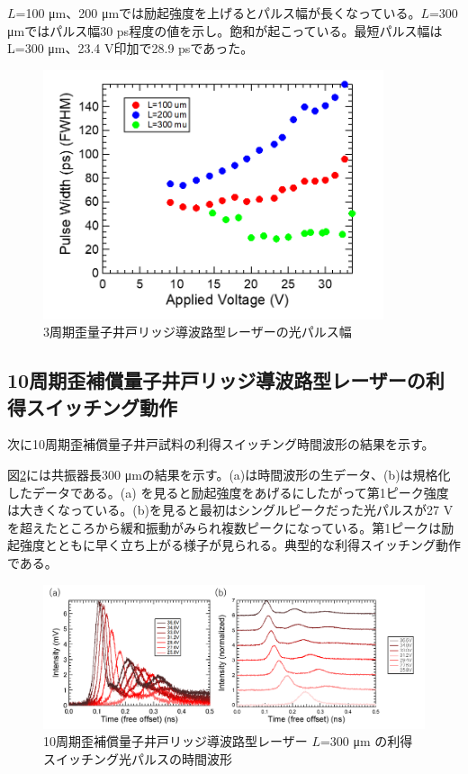 {{$L$=100 \si{\micro\metre}、200 \si{\micro\metre}では励起強度を上げるとパルス幅が長くなっている。$L$=300 \si{\micro\metre}ではパルス幅30 ps程度の値を示し。飽和が起こっている。最短パルス幅はL=300 \si{\micro m}、23.4 V印加で28.9 psであった。
\begin{figure}[ht]
	\centering
	\includegraphics[width=10cm]{figure/fig_3_2_3QW_ridge_GS_FWHM.png}
		\caption{3周期歪量子井戸リッジ導波路型レーザーの光パルス幅}
		\label{fig:fig_3_2_3QW_ridge_GS_FWHM}
\end{figure}
\clearpage
\subsection{10周期歪補償量子井戸リッジ導波路型レーザーの利得スイッチング動作}%
次に10周期歪補償量子井戸試料の利得スイッチング時間波形の結果を示す。

図\ref{fig:fig_3_2_10QW_ridge_L300_GS}には共振器長300 \si{\micro\metre}の結果を示す。(a)は時間波形の生データ、(b)は規格化したデータである。(a) を見ると励起強度をあげるにしたがって第1ピーク強度は大きくなっている。(b)を見ると最初はシングルピークだった光パルスが27 Vを超えたところから緩和振動がみられ複数ピークになっている。第1ピークは励起強度とともに早く立ち上がる様子が見られる。典型的な利得スイッチング動作である。
\begin{figure}[h]
	\centering
	\includegraphics[width=15cm]{figure/fig_3_2_10QW_ridge_L300_GS.png}
		\caption{10周期歪補償量子井戸リッジ導波路型レーザー $L$=300 \si{\micro\metre} の利得スイッチング光パルスの時間波形}
		\label{fig:fig_3_2_10QW_ridge_L300_GS}
\end{figure}


}}
